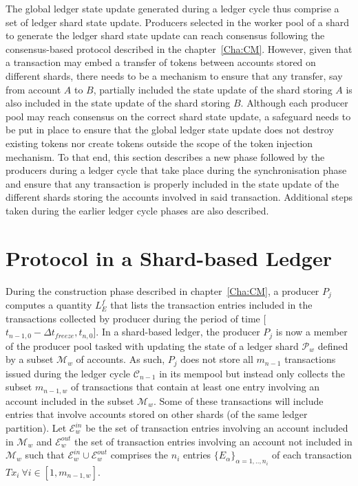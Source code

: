 The global ledger state update generated during a ledger cycle thus comprise a set of ledger shard state update. Producers selected in the worker pool of a shard to generate the ledger shard state update can reach consensus following the consensus-based protocol described in the chapter~\ref{Cha:CM}. However, given that a transaction may embed a transfer of tokens between accounts stored on different shards, there needs to be a mechanism to ensure that any transfer, say from account $A$ to $B$, partially included the state update of the shard storing $A$ is also included in the state update of the shard storing $B$. Although each producer pool may reach consensus on the correct shard state update, a safeguard needs to be put in place to ensure that the global ledger state update does not destroy existing tokens nor create tokens outside the scope of the token injection mechanism. To that end, this section describes a new phase followed by the producers during a ledger cycle that take place during the synchronisation phase and ensure that any transaction is properly included in the state update of the different shards storing the accounts involved in said transaction.  Additional steps taken during the earlier ledger cycle phases are also described.

\section{Protocol in a Shard-based Ledger}

During the construction phase described in chapter~\ref{Cha:CM}, a producer $P_j$ computes a quantity $L_E^f$ that lists the transaction entries included in the transactions collected by producer during the period of time [$t_{n-1,0} - \Delta t_{freeze}, t_{n,0}$]. In a shard-based ledger, the producer $P_j$ is now a member of the producer pool tasked with updating the state of a ledger shard $\mathcal{P}_w$ defined by a subset $\mathcal{M}_w$ of accounts. As such, $P_j$ does not store all $m_{n-1}$ transactions issued during the ledger cycle $\mathcal{C}_{n-1}$ in its mempool but instead only collects the subset $m_{n-1,w}$ of transactions that contain at least one entry involving  an account included in the subset $\mathcal{M}_w$. Some of these transactions will include entries that involve accounts stored on other shards (of the same ledger partition). Let $\mathcal{E}^{in}_w$ be the set of transaction entries involving an account included in $\mathcal{M}_w$ and $\mathcal{E}^{out}_w$ the set of transaction entries involving  an account not included in $\mathcal{M}_w$ such that $\mathcal{E}^{in}_w \cup \mathcal{E}^{out}_w$ comprises the $n_i$ entries $\{E_\alpha\}_{\alpha=1,..,n_i}$ of each transaction $Tx_i~\forall i \in  [1, m_{n-1,w}]$.\\

